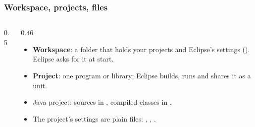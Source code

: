 \documentclass[aspectratio=169,10pt,compress]{beamer}
\begin{document}
\begin{frame}[t,fragile] \frametitle{Workspace, projects, files}
  \begin{columns}[T]
    \begin{column}{0.5\textwidth}
      \begin{center}
      \end{center}
    \end{column}
    \begin{column}{0.46\textwidth}
      \begin{itemize}\small
        \item \textbf{Workspace}: a folder that holds your projects and Eclipse's settings ().
              Eclipse asks for it at start.
        \item \textbf{Project}: one program or library; Eclipse builds, runs and shares it as a unit.
        \item Java project: sources in , compiled classes in .
        \item The project's settings are plain files: , , .
      \end{itemize}
    \end{column}
  \end{columns}
\end{frame}
\end{document}
